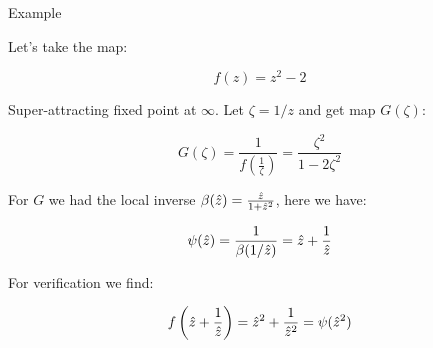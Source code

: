 \begin{frame}{Example}

    \begin{exl}
Let's take the map:

$$f(z) = z^2 -2$$ 

Super-attracting fixed point at $\infty$. Let $\zeta = 1/z$ and get map $G(\zeta)$:

$$G(\zeta) = \frac{1}{f\left(\frac{1}{\zeta}\right)} = \frac{\zeta^2}{1-2\zeta^2}$$

For $G$ we had the local inverse $\beta(\hat{z}) = \frac{\hat{z}}{1+\hat{z}^2}$, here we have:

$$\psi(\hat{z}) = \frac{1}{\beta(1/\hat{z})} = \hat{z} +\frac{1}{\hat{z}}$$

For verification we find:

$$f\left(\hat{z} + \frac{1}{\hat{z}}\right) = \hat{z}^2 + \frac{1}{\hat{z}^2} = \psi(\hat{z}^2)$$


\end{exl}

\end{frame}